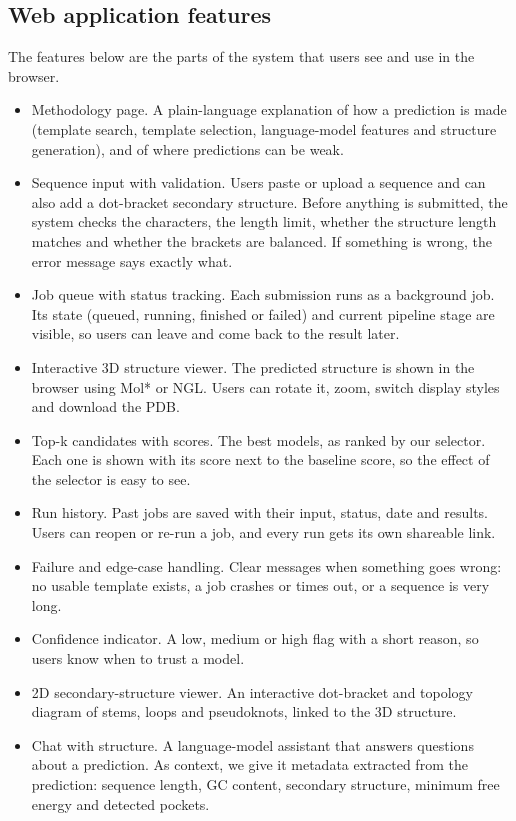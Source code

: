 \documentclass{FastFyp}
\begin{document}
\subsection{Web application features}
The features below are the parts of the system that users see and use in the browser.
\begin{itemize}
\item Methodology page. A plain-language explanation of how a prediction is made (template search, template selection, language-model features and structure generation), and of where predictions can be weak.
\item Sequence input with validation. Users paste or upload a sequence and can also add a dot-bracket secondary structure. Before anything is submitted, the system checks the characters, the length limit, whether the structure length matches and whether the brackets are balanced. If something is wrong, the error message says exactly what.
\item Job queue with status tracking. Each submission runs as a background job. Its state (queued, running, finished or failed) and current pipeline stage are visible, so users can leave and come back to the result later.
\item Interactive 3D structure viewer. The predicted structure is shown in the browser using Mol* or NGL. Users can rotate it, zoom, switch display styles and download the PDB.
\item Top-k candidates with scores. The best models, as ranked by our selector. Each one is shown with its score next to the baseline score, so the effect of the selector is easy to see.
\item Run history. Past jobs are saved with their input, status, date and results. Users can reopen or re-run a job, and every run gets its own shareable link.
\item Failure and edge-case handling. Clear messages when something goes wrong: no usable template exists, a job crashes or times out, or a sequence is very long.
\item Confidence indicator. A low, medium or high flag with a short reason, so users know when to trust a model.
\item 2D secondary-structure viewer. An interactive dot-bracket and topology diagram of stems, loops and pseudoknots, linked to the 3D structure.
\item Chat with structure. A language-model assistant that answers questions about a prediction. As context, we give it metadata extracted from the prediction: sequence length, GC content, secondary structure, minimum free energy and detected pockets.
\end{itemize}
\end{document}
